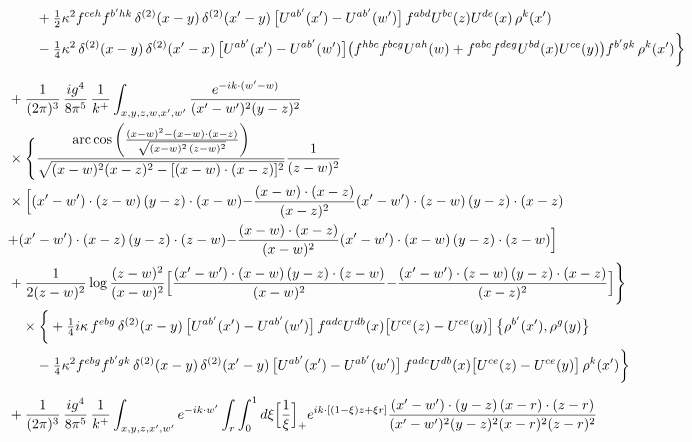 \documentclass[10pt]{article}
\numberwithin{equation}{section}
\begin{document}
\begin{align}
&\qquad+\tfrac12\kappa^{2}f^{ceh}f^{b^{\prime}hk}\,\delta^{(2)}(x-y)\,\delta^{(2)}(x^{\prime}-y)\,\big[U^{ab^{\prime}}(x^{\prime})-U^{ab^{\prime}}(w^{\prime})\big]\,f^{abd}U^{bc}(z)U^{de}(x)\,\rho^{k}(x^{\prime})\notag\\
&\qquad-\tfrac14\kappa^{2}\,\delta^{(2)}(x-y)\,\delta^{(2)}(x^{\prime}-x)\,\big[U^{ab^{\prime}}(x^{\prime})-U^{ab^{\prime}}(w^{\prime})\big]\big(f^{hbc}f^{bcg}U^{ah}(w)+f^{abc}f^{deg}U^{bd}(x)U^{ce}(y)\big)f^{b^{\prime}gk}\,\rho^{k}(x^{\prime})\bigg\}\notag\\[6pt]
&+\frac{1}{(2\pi)^{3}}\,\frac{ig^{4}}{8\pi^{5}}\,\frac{1}{k^{+}}\int_{x,y,z,w,x^{\prime},w^{\prime}}\frac{e^{-ik\cdot(w^{\prime}-w)}}{(x^{\prime}-w^{\prime})^{2}(y-z)^{2}}\notag\\
&\times\Bigg\{\frac{\mathrm{arc\,cos}\left(\frac{(x-w)^{2}-(x-w)\cdot (x-z)}{\sqrt{(x-w)^{2}\,(z-w)^{2}}}\right)}{\sqrt{(x-w)^{2}(x-z)^{2}-[(x-w)\cdot(x-z)]^{2}}}\frac{1}{(z-w)^{2}}\notag\\
&\times\Big[{(x^{\prime}-w^{\prime})\cdot(z-w)\,(y-z)\cdot(x-w)}{-\frac{(x-w)\cdot(x-z)}{(x-z)^{2}}(x^{\prime}-w^{\prime})\cdot(z-w)\,(y-z)\cdot(x-z)}\notag\\
&{+(x^{\prime}-w^{\prime})\cdot(x-z)\,(y-z)\cdot(z-w)}{-\frac{(x-w)\cdot(x-z)}{(x-w)^{2}}(x^{\prime}-w^{\prime})\cdot(x-w)\,(y-z)\cdot(z-w)}\Big]\notag\\
&+\frac{1}{2(z-w)^{2}}\log\frac{(z-w)^{2}}{(x-w)^{2}}\Big[{\frac{(x^{\prime}-w^{\prime})\cdot(x-w)\,(y-z)\cdot(z-w)}{(x-w)^{2}}}{-\frac{(x^{\prime}-w^{\prime})\cdot(z-w)\,(y-z)\cdot(x-z)}{(x-z)^{2}}}\Big]\Bigg\}\notag\\
&\quad\times\bigg\{+\tfrac14 i\kappa\,f^{ebg}\,\delta^{(2)}(x-y)\,\big[U^{ab^{\prime}}(x^{\prime})-U^{ab^{\prime}}(w^{\prime})\big]\,f^{adc}U^{db}(x)\big[U^{ce}(z)-U^{ce}(y)\big]\,\big\{\rho^{b^{\prime}}(x^{\prime}),\rho^{g}(y)\big\}\notag\\
&\qquad-\tfrac14\kappa^{2}f^{ebg}f^{b^{\prime}gk}\,\delta^{(2)}(x-y)\,\delta^{(2)}(x^{\prime}-y)\,\big[U^{ab^{\prime}}(x^{\prime})-U^{ab^{\prime}}(w^{\prime})\big]\,f^{adc}U^{db}(x)\big[U^{ce}(z)-U^{ce}(y)\big]\,\rho^{k}(x^{\prime})\bigg\}\notag\\[6pt]
&+\frac{1}{(2\pi)^{3}}\,\frac{ig^{4}}{8\pi^{5}}\,\frac{1}{k^{+}}\int_{x,y,z,x^{\prime},w^{\prime}}e^{-ik\cdot w^{\prime}}\int_{r}\int_{0}^{1}d\xi\Big[\frac1\xi\Big]_{+}e^{ik\cdot[(1-\xi)z+\xi r]}\frac{(x^{\prime}-w^{\prime})\cdot(y-z)\,(x-r)\cdot(z-r)}{(x^{\prime}-w^{\prime})^{2}(y-z)^{2}(x-r)^{2}(z-r)^{2}}\notag\\

\end{align}
\end{document}
